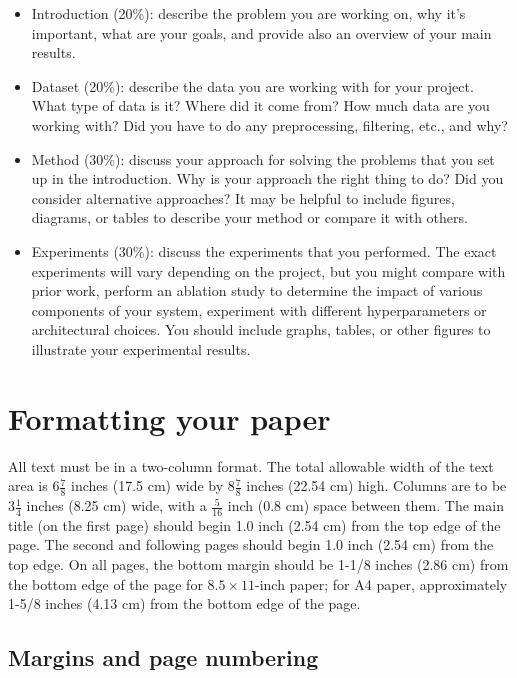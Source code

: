 \documentclass[10pt,twocolumn,letterpaper]{article}
\begin{document}
\begin{itemize}
	\item Introduction (20\%): describe the problem you are working on, why it's important, what are your goals, and provide also an overview of your main results.
	\item Dataset (20\%): describe the data you are working with for your project. What type of data is it? Where did it come from? How much data are you working with? Did you have to do any preprocessing, filtering, etc., and why?
	\item Method (30\%): discuss your approach for solving the problems that you set up in the introduction. Why is your approach the right thing to do? Did you consider alternative approaches? It may be helpful to include figures, diagrams, or tables to describe your method or compare it with others.
	\item Experiments (30\%): discuss the experiments that you performed. The exact experiments will vary depending on the project, but you might compare with prior work, perform an ablation study to determine the impact of various components of your system, experiment with different hyperparameters or architectural choices. You should include graphs, tables, or other figures to illustrate your experimental results.
\end{itemize}	

\section{Formatting your paper}

All text must be in a two-column format. The total allowable width of the
text area is $6\frac78$ inches (17.5 cm) wide by $8\frac78$ inches (22.54
cm) high. Columns are to be $3\frac14$ inches (8.25 cm) wide, with a
$\frac{5}{16}$ inch (0.8 cm) space between them. The main title (on the
first page) should begin 1.0 inch (2.54 cm) from the top edge of the
page. The second and following pages should begin 1.0 inch (2.54 cm) from
the top edge. On all pages, the bottom margin should be 1-1/8 inches (2.86
cm) from the bottom edge of the page for $8.5 \times 11$-inch paper; for A4
paper, approximately 1-5/8 inches (4.13 cm) from the bottom edge of the
page.

\subsection{Margins and page numbering}
\end{document}
